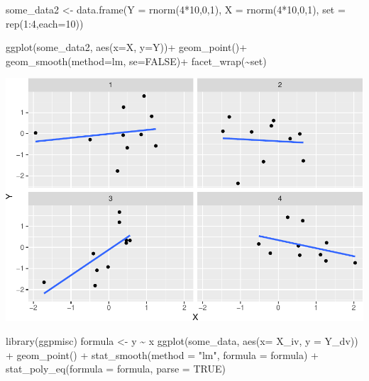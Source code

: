 \documentclass[
  english,
  man]{article}
\newenvironment{Shaded}{\begin{snugshade}}{\end{snugshade}}
\newcommand{\AttributeTok}[1]{\textcolor[rgb]{0.77,0.63,0.00}{#1}}
\newcommand{\ConstantTok}[1]{\textcolor[rgb]{0.00,0.00,0.00}{#1}}
\newcommand{\DecValTok}[1]{\textcolor[rgb]{0.00,0.00,0.81}{#1}}
\newcommand{\FunctionTok}[1]{\textcolor[rgb]{0.00,0.00,0.00}{#1}}
\newcommand{\NormalTok}[1]{#1}
\newcommand{\OtherTok}[1]{\textcolor[rgb]{0.56,0.35,0.01}{#1}}
\newcommand{\SpecialCharTok}[1]{\textcolor[rgb]{0.00,0.00,0.00}{#1}}
\newcommand{\StringTok}[1]{\textcolor[rgb]{0.31,0.60,0.02}{#1}}
\begin{document}
\begin{Shaded}
\begin{Highlighting}[]
\NormalTok{some\_data2 }\OtherTok{\textless{}{-}} \FunctionTok{data.frame}\NormalTok{(}\AttributeTok{Y =} \FunctionTok{rnorm}\NormalTok{(}\DecValTok{4}\SpecialCharTok{*}\DecValTok{10}\NormalTok{,}\DecValTok{0}\NormalTok{,}\DecValTok{1}\NormalTok{),}
                         \AttributeTok{X =} \FunctionTok{rnorm}\NormalTok{(}\DecValTok{4}\SpecialCharTok{*}\DecValTok{10}\NormalTok{,}\DecValTok{0}\NormalTok{,}\DecValTok{1}\NormalTok{),}
                        \AttributeTok{set =} \FunctionTok{rep}\NormalTok{(}\DecValTok{1}\SpecialCharTok{:}\DecValTok{4}\NormalTok{,}\AttributeTok{each=}\DecValTok{10}\NormalTok{))}

\FunctionTok{ggplot}\NormalTok{(some\_data2, }\FunctionTok{aes}\NormalTok{(}\AttributeTok{x=}\NormalTok{X, }\AttributeTok{y=}\NormalTok{Y))}\SpecialCharTok{+}
  \FunctionTok{geom\_point}\NormalTok{()}\SpecialCharTok{+}
  \FunctionTok{geom\_smooth}\NormalTok{(}\AttributeTok{method=}\StringTok{\textquotesingle{}lm\textquotesingle{}}\NormalTok{, }\AttributeTok{se=}\ConstantTok{FALSE}\NormalTok{)}\SpecialCharTok{+}
  \FunctionTok{facet\_wrap}\NormalTok{(}\SpecialCharTok{\textasciitilde{}}\NormalTok{set)}
\end{Highlighting}
\end{Shaded}

\includegraphics{CopyOflab12_files/figure-latex/unnamed-chunk-4-1.pdf}

\begin{Shaded}
\begin{Highlighting}[]
\FunctionTok{library}\NormalTok{(ggpmisc)}
\NormalTok{formula }\OtherTok{\textless{}{-}}\NormalTok{ y }\SpecialCharTok{\textasciitilde{}}\NormalTok{ x}
\FunctionTok{ggplot}\NormalTok{(some\_data, }\FunctionTok{aes}\NormalTok{(}\AttributeTok{x=}\NormalTok{ X\_iv, }\AttributeTok{y =}\NormalTok{ Y\_dv)) }\SpecialCharTok{+}
  \FunctionTok{geom\_point}\NormalTok{() }\SpecialCharTok{+}
  \FunctionTok{stat\_smooth}\NormalTok{(}\AttributeTok{method =} \StringTok{"lm"}\NormalTok{, }\AttributeTok{formula =}\NormalTok{ formula) }\SpecialCharTok{+}
  \FunctionTok{stat\_poly\_eq}\NormalTok{(}\AttributeTok{formula =}\NormalTok{ formula, }\AttributeTok{parse =} \ConstantTok{TRUE}\NormalTok{)}
\end{Highlighting}
\end{Shaded}
\end{document}
